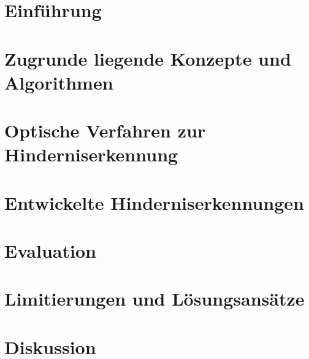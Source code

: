 \documentclass[pdftex,12pt,a4paper]{report}
\begin{document}
\chapter{Einführung}
\label{chp:introduction}



\chapter{Zugrunde liegende Konzepte und Algorithmen}
\label{chp:concepts}



\chapter{Optische Verfahren zur Hinderniserkennung}
\label{chp:stateoftheart}



\chapter{Entwickelte Hinderniserkennungen}
\label{chp:developed_algorithms}



\chapter{Evaluation}
\label{chp:evaluation}



\chapter{Limitierungen und Lösungsansätze}
\label{chp:conflicts}



\chapter{Diskussion}
\label{chp:discussion}

\end{document}
